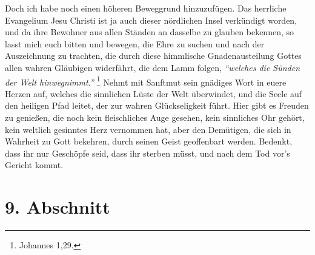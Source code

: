 Doch ich habe noch einen höheren Beweggrund hinzuzufügen. Das herrliche
Evangelium Jesu Christi ist ja auch dieser nördlichen Insel verkündigt
worden, und da ihre Bewohner aus allen Ständen an dasselbe zu glauben bekennen,
so lasst mich euch bitten und bewegen, die Ehre zu suchen und nach der
Auszeichnung zu trachten, die durch diese himmlische
Gnadenausteilung Gottes
allen wahren Gläubigen widerfährt, die dem Lamm folgen,
\textit{"`welches die Sünden
der Welt hinwegnimmt."'}
\footnote{Johannes 1,29.}
Nehmt mit Sanftmut sein gnädiges
Wort in euere Herzen auf, welches die sinnlichen Lüste der Welt
überwindet, und
die Seele auf den heiligen Pfad leitet, der zur wahren Glückseligkeit führt.
Hier gibt es Freuden zu genießen, die noch kein fleischliches Auge gesehen,
kein sinnliches Ohr gehört, kein weltlich gesinntes Herz vernommen hat, aber den
Demütigen, die sich in Wahrheit zu Gott bekehren, durch seinen Geist
geoffenbart werden. Bedenkt, dass ihr nur Geschöpfe seid, dass ihr sterben müsst,
und nach dem Tod vor's Gericht kommt.

\section{9. Abschnitt} \label{kap11_ab9}

